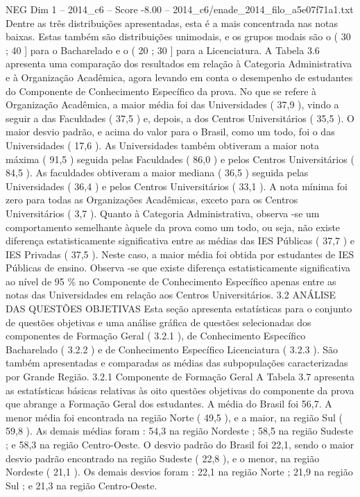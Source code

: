 \begin{textsample}{NEG Dim 1 – 2014\_c6 – Score -8.00 – 2014\_c6/enade\_2014\_filo\_a5e07f71a1.txt}
Dentre as três distribuições apresentadas, esta é a mais concentrada nas notas baixas.
Estas também são distribuições unimodais, e os grupos modais são o ( 30 ; 40 ] para o Bacharelado e o ( 20 ; 30 ] para a Licenciatura.
A Tabela 3.6 apresenta uma comparação dos resultados em relação à Categoria Administrativa e à Organização Acadêmica, agora levando em conta o desempenho de estudantes do Componente de Conhecimento Específico da prova.
No que se refere à Organização Acadêmica, a maior média foi das Universidades ( 37,9 ), vindo a seguir a das Faculdades ( 37,5 ) e, depois, a dos Centros Universitários ( 35,5 ).
O maior desvio padrão, e acima do valor para o Brasil, como um todo, foi o das Universidades ( 17,6 ).
As Universidades também obtiveram a maior nota máxima ( 91,5 ) seguida pelas Faculdades ( 86,0 ) e pelos Centros Universitários ( 84,5 ).
As faculdades obtiveram a maior mediana ( 36,5 ) seguida pelas Universidades ( 36,4 ) e pelos Centros Universitários ( 33,1 ).
A nota mínima foi zero para todas as Organizações Acadêmicas, exceto para os Centros Universitários ( 3,7 ).
Quanto à Categoria Administrativa, observa -se um comportamento semelhante àquele da prova como um todo, ou seja, não existe diferença estatisticamente significativa entre as médias das IES Públicas ( 37,7 ) e IES Privadas ( 37,5 ).
Neste caso, a maior média foi obtida por estudantes de IES Públicas de ensino.
Observa -se que existe diferença estatisticamente significativa ao nível de 95 \% no Componente de Conhecimento Específico apenas entre as notas das Universidades em relação aos Centros Universitários. 3.2 ANÁLISE DAS QUESTÕES OBJETIVAS Esta seção apresenta estatísticas para o conjunto de questões objetivas e uma análise gráfica de questões selecionadas dos componentes de Formação Geral ( 3.2.1 ), de Conhecimento Específico Bacharelado ( 3.2.2 ) e de Conhecimento Específico Licenciatura ( 3.2.3 ).
São também apresentadas e comparadas as médias das subpopulações caracterizadas por Grande Região. 3.2.1 Componente de Formação Geral A Tabela 3.7 apresenta as estatísticas básicas relativas às oito questões objetivas do componente da prova que abrange a Formação Geral dos estudantes.
A média do Brasil foi 56,7.
A menor média foi encontrada na região Norte ( 49,5 ), e a maior, na região Sul ( 59,8 ).
As demais médias foram : 54,3 na região Nordeste ; 58,5 na região Sudeste ; e 58,3 na região Centro-Oeste.
O desvio padrão do Brasil foi 22,1, sendo o maior desvio padrão encontrado na região Sudeste ( 22,8 ), e o menor, na região Nordeste ( 21,1 ).
Os demais desvios foram : 22,1 na região Norte ; 21,9 na região Sul ; e 21,3 na região Centro-Oeste.

\end{textsample}
